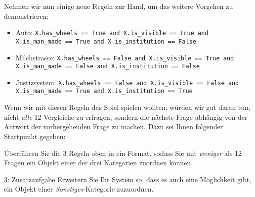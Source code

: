 \begin{lpu}
Nehmen wir nun einige neue Regeln zur Hand, um das weitere Vorgehen zu demonstrieren:

\begin{itemize}
    \item Auto: \texttt{X.has\_wheels == True and X.is\_visible == True and X.is\_man\_made == True and X.is\_institution == False}
    \item Milchstrasse: \texttt{X.has\_wheels == False and X.is\_visible == True and X.is\_man\_made == False and X.is\_institution == False}
    \item Justizsystem: \texttt{X.has\_wheels == False and X.is\_visible == False and X.is\_man\_made == True and X.is\_institution == True} 
\end{itemize}

Wenn wir mit diesen Regeln das Spiel spielen wollten, würden wir gut daran tun, nicht \textit{alle} 12 Vergleiche zu erfragen, sondern die nächste Frage abhängig von der Antwort der vorhergehenden Frage zu machen. Dazu sei Ihnen folgender Startpunkt gegeben:

\begin{center}
\end{center}

\begin{aufgabe}{3}
Überführen Sie die 3 Regeln oben in ein Format, sodass Sie mit \textit{weniger} als 12 Fragen ein Objekt einer der drei Kategorien zuordnen können.
\end{aufgabe}


\begin{aufgabe}{3: Zusatzaufgabe}
Erweitern Sie Ihr System so, dass es auch eine Möglichkeit gibt, ein Objekt einer \textit{Sonstiges}-Kategorie zuzuordnen.
\end{aufgabe}


\end{lpu}
